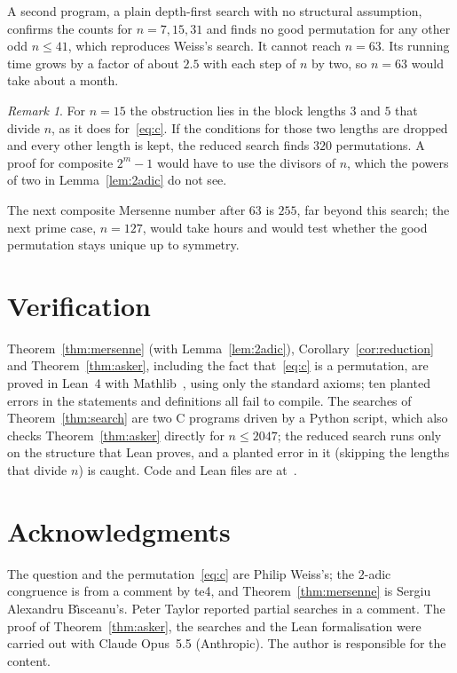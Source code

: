 \documentclass[11pt]{amsart}
\theoremstyle{remark}
\newtheorem{remark}[theorem]{Remark}
\begin{document}
A second program, a plain depth-first search with no structural assumption, confirms the counts for $n=7,15,31$ and finds no good permutation for any other odd $n\le41$, which reproduces Weiss's search. It cannot reach $n=63$. Its running time grows by a factor of about $2.5$ with each step of $n$ by two, so $n=63$ would take about a month.

\begin{remark}
For $n=15$ the obstruction lies in the block lengths $3$ and $5$ that divide $n$, as it does for~\eqref{eq:c}. If the conditions for those two lengths are dropped and every other length is kept, the reduced search finds $320$ permutations. A proof for composite $2^m-1$ would have to use the divisors of $n$, which the powers of two in Lemma~\ref{lem:2adic} do not see.
\end{remark}

The next composite Mersenne number after $63$ is $255$, far beyond this search; the next prime case, $n=127$, would take hours and would test whether the good permutation stays unique up to symmetry.

\section{Verification}

Theorem~\ref{thm:mersenne} (with Lemma~\ref{lem:2adic}), Corollary~\ref{cor:reduction} and Theorem~\ref{thm:asker}, including the fact that~\eqref{eq:c} is a permutation, are proved in Lean~4 with Mathlib~\cite{mathlib}, using only the standard axioms; ten planted errors in the statements and definitions all fail to compile. The searches of Theorem~\ref{thm:search} are two C programs driven by a Python script, which also checks Theorem~\ref{thm:asker} directly for $n\le2047$; the reduced search runs only on the structure that Lean proves, and a planted error in it (skipping the lengths that divide $n$) is caught. Code and Lean files are at~\cite{repo}.

\section*{Acknowledgments}

The question and the permutation~\eqref{eq:c} are Philip Weiss's; the $2$-adic congruence is from a comment by te4, and Theorem~\ref{thm:mersenne} is Sergiu Alexandru B\^{\i}sceanu's. Peter Taylor reported partial searches in a comment. The proof of Theorem~\ref{thm:asker}, the searches and the Lean formalisation were carried out with Claude Opus~5.5 (Anthropic). The author is responsible for the content.
\end{document}
